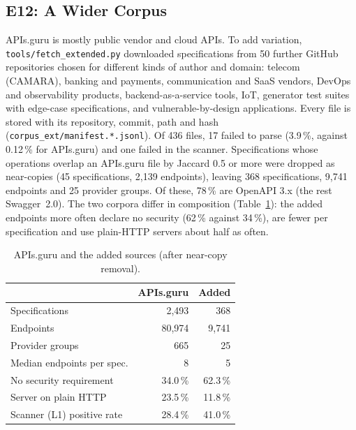 \documentclass[conference]{IEEEtran}
\begin{document}
\subsection{E12: A Wider Corpus}
\label{sec:corpus-ext}
APIs.guru is mostly public vendor and cloud APIs. To add variation, \texttt{tools/fetch\_extended.py} downloaded specifications from 50 further GitHub repositories chosen for
different kinds of author and domain: telecom (CAMARA), banking and payments, communication and SaaS vendors, DevOps and observability products, backend-as-a-service tools, IoT, generator test suites with edge-case specifications, and vulnerable-by-design applications.
Every file is stored with its repository, commit, path and hash (\texttt{corpus\_ext/manifest.*.jsonl}). Of 436 files, 17 failed to parse (3.9\,\%, against 0.12\,\% for APIs.guru) and one failed in the scanner. Specifications whose operations overlap an APIs.guru file by Jaccard 0.5 or more
were dropped as near-copies (45 specifications, 2{,}139 endpoints), leaving 368 specifications, 9{,}741 endpoints and 25 provider groups. Of these, 78\,\% are OpenAPI 3.x (the rest Swagger~2.0). The two corpora differ in composition (Table~\ref{tab:ext}): the added endpoints more often declare no security (62\,\% against 34\,\%),
are fewer per specification and use plain-HTTP servers about half as often.

\begin{table}[!t]
\caption{APIs.guru and the added sources (after near-copy removal).}
\label{tab:ext}
\centering
\footnotesize
\begin{tabular}{lrr}
\toprule
 & \textbf{APIs.guru} & \textbf{Added}\\
\midrule
Specifications & 2{,}493 & 368\\
Endpoints & 80{,}974 & 9{,}741\\
Provider groups & 665 & 25\\
Median endpoints per spec. & 8 & 5\\
No security requirement & 34.0\,\% & 62.3\,\%\\
Server on plain HTTP & 23.5\,\% & 11.8\,\%\\
Scanner (L1) positive rate & 28.4\,\% & 41.0\,\%\\
\bottomrule
\end{tabular}
\end{table}
\end{document}
